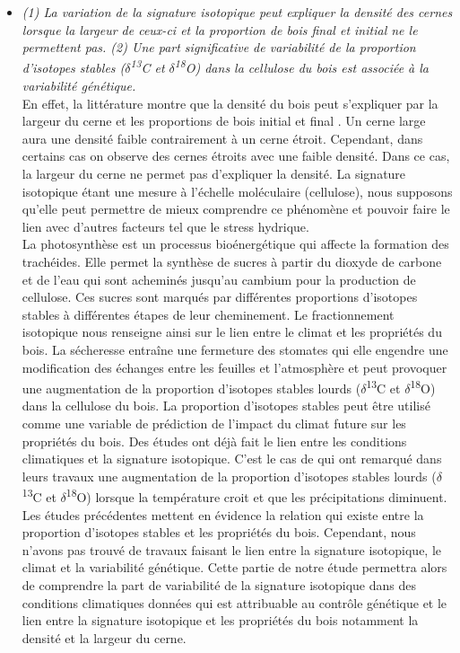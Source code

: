 \documentclass[a4paper,12pt]{report}
\newcommand{\Ctreize}{$\delta$\textsuperscript{13}C\xspace}
\newcommand{\Odixhuit}{$\delta$\textsuperscript{18}O\xspace}
\begin{document}
\begin{itemize}
	\item \emph{(1) La variation de la signature isotopique peut expliquer la densité des cernes lorsque la largeur de ceux-ci et la proportion de bois final et initial ne le permettent pas. (2) Une part significative de variabilité de la proportion d'isotopes stables (\Ctreize et \Odixhuit) dans la cellulose du bois est associée à la variabilité génétique.} \\ 
	
	En effet, la littérature montre que la densité du bois peut s'expliquer par la largeur du cerne et les proportions de bois initial et final \citep{Moore2011}. Un cerne large aura une densité faible contrairement à un cerne étroit. Cependant, dans certains cas on observe des cernes étroits avec une faible densité. Dans ce cas, la largeur du cerne ne permet pas d'expliquer la densité. La signature isotopique étant une mesure à l'échelle moléculaire (cellulose), nous supposons qu'elle peut permettre de mieux comprendre ce phénomène et pouvoir faire le lien avec d'autres facteurs tel que le stress hydrique.\\
	
	La photosynthèse est un processus bioénergétique qui affecte la formation des trachéides. Elle permet la synthèse de sucres à partir du dioxyde de carbone et de l'eau qui sont acheminés jusqu'au cambium pour la production de cellulose. Ces sucres sont marqués par différentes proportions d'isotopes stables à différentes étapes de leur cheminement. Le fractionnement isotopique nous renseigne ainsi sur le lien entre le climat et les propriétés du bois. La sécheresse entraîne une fermeture des stomates \citep{Farquhar1989, Farquhar1993, Nicolas2017} qui elle engendre une modification des échanges entre les feuilles et l'atmosphère et peut provoquer une augmentation de la proportion d'isotopes stables lourds (\Ctreize et \Odixhuit) \citep{McCarroll2004,Skomarkova2006,Vaganov2009,Cernusak2015} dans la cellulose du bois. La proportion d'isotopes stables peut être utilisé comme une variable de prédiction de l'impact du climat future sur les propriétés du bois. Des études ont déjà fait le lien entre les conditions climatiques et la signature isotopique. C'est le cas de  \cite{Seftigen2011} qui ont remarqué dans leurs travaux une augmentation de la proportion d'isotopes stables lourds (\Ctreize et \Odixhuit) lorsque la température croit et que les précipitations diminuent.\\
	
	Les études précédentes mettent en évidence la relation qui existe entre la proportion d'isotopes stables et les propriétés du bois. Cependant, nous n'avons pas trouvé de travaux faisant le lien entre la signature isotopique, le climat et la variabilité génétique. Cette partie de notre étude permettra alors de comprendre la part de variabilité de la signature isotopique dans des conditions climatiques données qui est attribuable au contrôle génétique et le lien entre la signature isotopique et les propriétés du bois notamment la densité et la largeur du cerne. 
	
	
\end{itemize} 
\end{document}
